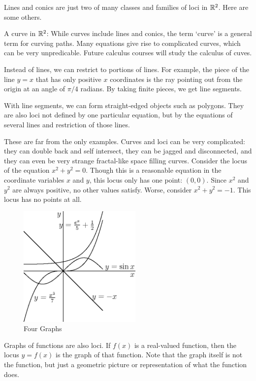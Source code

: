 \documentclass[fleqn]{report}
\begin{document}
Lines and conics are just two of many classes and families of
loci in $\mathbb{R}^2$. Here are some others.
\begin{smallitemize}
\item A curve in $\mathbb{R}^2$: While curves include lines and
conics, the term `curve' is a general term for curving paths.
Many equations give rise to complicated curves, which can 
be very unpredicable. Future calculus courses will study the
calculus of cuves.
\item Instead of lines, we can restrict to portions of lines.
For example, the piece of the line $y=x$ that has only positive
$x$ coordinates is the ray pointing out from the origin at an
angle of $\pi/4$ radians. By taking finite pieces, we get line
segments.
\item With line segments, we can form straight-edged objects
such as polygons. They are also loci not defined by one
particular equation, but by the equations of several lines and
restriction of those lines.
\end{smallitemize}
These are far from the only examples. Curves and loci can be
very complicated: they can double back and self intersect,
they can be jagged and disconnected, and they can even be very
strange fractal-like space filling curves. Consider the locus
of the equation $x^2 + y^2 =0$. Though this is a reasonable
equation in the coordinate variables $x$ and $y$, this locus
only has one point: $(0,0)$. Since $x^2$ and $y^2$ are always
positive, no other values satisfy. Worse, consider $x^2 + y^2
= -1$. This locus has no points at all.

\begin{figure}[t]
\centering
\includegraphics[width=6cm]{figure08.eps}
\caption{Four Graphs}
\label{figure-four-graphs} 
\end{figure}

Graphs of functions are also loci. If $f(x)$ is a real-valued
function, then the locus $y = f(x)$ is the graph of that
function. Note that the graph itself is not the function, but
just a geometric picture or representation of what the
function does. 
\end{document}
